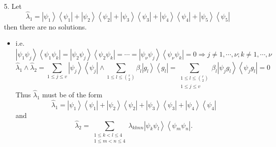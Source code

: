 \documentclass[aps,preprint]{revtex4}%
\begin{document}
5. Let
\begin{equation}
\hat{\lambda}_{1}=\left\vert \psi_{1}\right\rangle \left\langle \psi
_{1}\right\vert +\left\vert \psi_{2}\right\rangle \left\langle \psi
_{2}\right\vert +\left\vert \psi_{3}\right\rangle \left\langle \psi
_{3}\right\vert +\left\vert \psi_{4}\right\rangle \left\langle \psi
_{4}\right\vert +\left\vert \psi_{5}\right\rangle \left\langle \psi
_{5}\right\vert
\end{equation}
then there are no solutions.

\begin{itemize}
\item i.e.
\begin{equation}
\left\vert \psi_{1}\psi_{j}\right\rangle \left\langle \psi_{1}\psi
_{k}\right\vert =\left\vert \psi_{2}\psi_{j}\right\rangle \left\langle
\psi_{2}\psi_{k}\right\vert =\cdots=\left\vert \psi_{\nu}\psi_{j}\right\rangle
\left\langle \psi_{\nu}\psi_{k}\right\vert =0\Rightarrow j\neq1,\cdots
,\nu;k\neq1,\cdots,\nu
\end{equation}%
\begin{equation}
\hat{\lambda}_{1}\wedge\hat{\lambda}_{2}=\sum_{1\leq j\leq v}\left\vert
\psi_{j}\right\rangle \left\langle \psi_{j}\right\vert \wedge\sum_{1\leq
l\leq\binom{r}{2}}\beta_{l}\left\vert g_{l}\right\rangle \left\langle
g_{l}\right\vert =\sum_{\substack{1\leq l\leq\binom{r}{2}\\1\leq j\leq
v}}\beta_{l}\left\vert \psi_{j}g_{l}\right\rangle \left\langle \psi_{j}%
g_{l}\right\vert =0
\end{equation}
Thus $\hat{\lambda}_{1}$ must be of the form
\begin{equation}
\hat{\lambda}_{1}=\left\vert \psi_{1}\right\rangle \left\langle \psi
_{1}\right\vert +\left\vert \psi_{2}\right\rangle \left\langle \psi
_{2}\right\vert +\left\vert \psi_{3}\right\rangle \left\langle \psi
_{3}\right\vert +\left\vert \psi_{4}\right\rangle \left\langle \psi
_{4}\right\vert
\end{equation}
and
\begin{equation}
\hat{\lambda}_{2}=\sum_{\substack{1\leq k<l\leq4\\1\leq m<n\leq4}%
}\lambda_{klmn}\left\vert \psi_{k}\psi_{l}\right\rangle \left\langle \psi
_{m}\psi_{n}\right\vert .
\end{equation}



\end{itemize}
\end{document}

